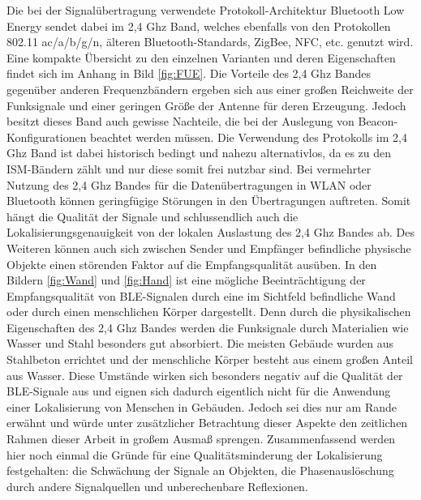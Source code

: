 Die bei der Signalübertragung verwendete Protokoll-Architektur Bluetooth Low Energy sendet dabei im 2,4 Ghz Band, welches ebenfalls von den Protokollen 802.11 ac/a/b/g/n, älteren Bluetooth-Standards, ZigBee, NFC, etc. genutzt wird. Eine kompakte Übersicht zu den einzelnen Varianten und deren Eigenschaften findet sich im Anhang in Bild \ref{fig:FUE}. Die Vorteile des 2,4 Ghz Bandes gegenüber anderen Frequenzbändern ergeben sich aus einer großen Reichweite der Funksignale und einer geringen Größe der Antenne für deren Erzeugung. Jedoch besitzt dieses Band auch gewisse Nachteile, die bei der Auslegung von Beacon-Konfigurationen beachtet werden müssen. Die Verwendung des Protokolls im 2,4 Ghz Band ist dabei historisch bedingt und nahezu alternativlos, da es zu den ISM-Bändern \cite{BuNet} zählt und nur diese somit frei nutzbar sind. Bei vermehrter Nutzung des 2,4 Ghz Bandes für die Datenübertragungen in WLAN oder Bluetooth können geringfügige Störungen in den Übertragungen auftreten. Somit hängt die Qualität der Signale und schlussendlich auch die Lokalisierungsgenauigkeit von der lokalen Auslastung des 2,4 Ghz Bandes ab. Des Weiteren können auch sich zwischen Sender und Empfänger befindliche physische Objekte einen störenden Faktor auf die Empfangsqualität ausüben. In den Bildern \ref{fig:Wand} und \ref{fig:Hand} ist eine mögliche Beeinträchtigung der Empfangsqualität von BLE-Signalen durch eine im Sichtfeld befindliche Wand oder durch einen menschlichen Körper dargestellt. Denn durch die physikalischen Eigenschaften des 2,4 Ghz Bandes werden die Funksignale durch Materialien wie Wasser und Stahl besonders gut absorbiert. Die meisten Gebäude wurden aus Stahlbeton errichtet und der menschliche Körper besteht aus einem großen Anteil aus Wasser. Diese Umstände wirken sich besonders negativ auf die Qualität der BLE-Signale aus und eignen sich dadurch eigentlich nicht für die Anwendung einer Lokalisierung von Menschen in Gebäuden. Jedoch sei dies nur am Rande erwähnt und würde unter zusätzlicher Betrachtung dieser Aspekte den zeitlichen Rahmen dieser Arbeit in großem Ausmaß sprengen. Zusammenfassend werden hier noch einmal die Gründe für eine Qualitätsminderung der Lokalisierung festgehalten: die Schwächung der Signale an Objekten, die Phasenauslöschung durch andere Signalquellen und unberechenbare Reflexionen.\\ \\
